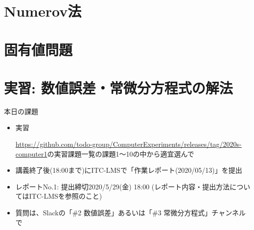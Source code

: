 \documentclass[10pt,dvipdfmx]{beamer}
\begin{document}




\section{Numerov法}





\section{固有値問題}





\section{実習: 数値誤差・常微分方程式の解法}

\begin{frame}[t]{本日の課題}
  \begin{itemize}
  \item 実習
    
    \url{https://github.com/todo-group/ComputerExperiments/releases/tag/2020s-computer1}の実習課題一覧の課題1〜10の中から適宜選んで
    
  \item 講義終了後(18:00まで)にITC-LMSで「作業レポート(2020/05/13)」を提出
  \item レポートNo.1: 提出締切2020/5/29(金) 18:00 (レポート内容・提出方法についてはITC-LMSを参照のこと)
  \item 質問は、Slackの「\#2 数値誤差」あるいは「\#3 常微分方程式」チャンネルで
  \end{itemize}
\end{frame}



\end{document}
